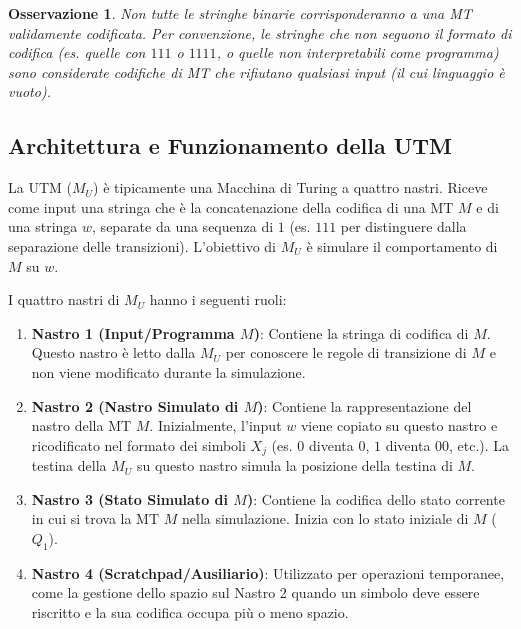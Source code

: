 \documentclass[a4paper, 11pt]{book} %
\newtheorem{remark}[theorem]{Osservazione}
\theoremstyle{definition}
\begin{document}
\begin{remark}
Non tutte le stringhe binarie corrisponderanno a una MT validamente codificata. Per convenzione, le stringhe che non seguono il formato di codifica (es. quelle con $111$ o $1111$, o quelle non interpretabili come programma) sono considerate codifiche di MT che rifiutano qualsiasi input (il cui linguaggio è vuoto).
\end{remark}

\subsection{Architettura e Funzionamento della UTM}

La UTM ($M_U$) è tipicamente una Macchina di Turing a quattro nastri. Riceve come input una stringa che è la concatenazione della codifica di una MT $M$ e di una stringa $w$, separate da una sequenza di $1$ (es. $111$ per distinguere dalla separazione delle transizioni). L'obiettivo di $M_U$ è simulare il comportamento di $M$ su $w$.

I quattro nastri di $M_U$ hanno i seguenti ruoli:
\begin{enumerate}
    \item \textbf{Nastro 1 (Input/Programma $M$)}: Contiene la stringa di codifica di $M$. Questo nastro è letto dalla $M_U$ per conoscere le regole di transizione di $M$ e non viene modificato durante la simulazione.
    \item \textbf{Nastro 2 (Nastro Simulato di $M$)}: Contiene la rappresentazione del nastro della MT $M$. Inizialmente, l'input $w$ viene copiato su questo nastro e ricodificato nel formato dei simboli $X_j$ (es. $0$ diventa $0$, $1$ diventa $00$, etc.). La testina della $M_U$ su questo nastro simula la posizione della testina di $M$.
    \item \textbf{Nastro 3 (Stato Simulato di $M$)}: Contiene la codifica dello stato corrente in cui si trova la MT $M$ nella simulazione. Inizia con lo stato iniziale di $M$ ($Q_1$).
    \item \textbf{Nastro 4 (Scratchpad/Ausiliario)}: Utilizzato per operazioni temporanee, come la gestione dello spazio sul Nastro 2 quando un simbolo deve essere riscritto e la sua codifica occupa più o meno spazio.
\end{enumerate}
\end{document}

